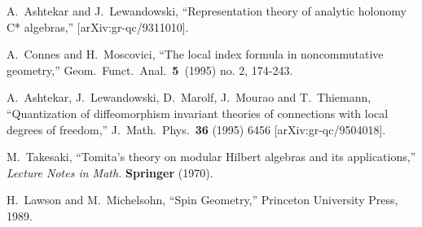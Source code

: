 \documentclass[12pt]{article}
\begin{document}
\begin{thebibliography}{99}
A.~Ashtekar and J.~Lewandowski,
``Representation theory of analytic holonomy C* algebras,''
[arXiv:gr-qc/9311010].




A.~Connes and H.~Moscovici,
``The local index formula in noncommutative geometry,''
Geom.\ Funct.\ Anal.\ {\bf 5}\ (1995) no. 2, 174-243.




  A.~Ashtekar, J.~Lewandowski, D.~Marolf, J.~Mourao and T.~Thiemann,
  ``Quantization of diffeomorphism invariant theories of connections with local
  degrees of freedom,''
  J.\ Math.\ Phys.\  {\bf 36} (1995) 6456
  [arXiv:gr-qc/9504018].




M.~Takesaki, ``Tomita's theory on modular Hilbert algebras and its
applications,'' {\it Lecture Notes in Math.} {\bf Springer} (1970).

  H.~Lawson and M.~Michelsohn,
  ``Spin Geometry,''
  Princeton University Press, 1989.
 






\end{thebibliography}
\end{document}

